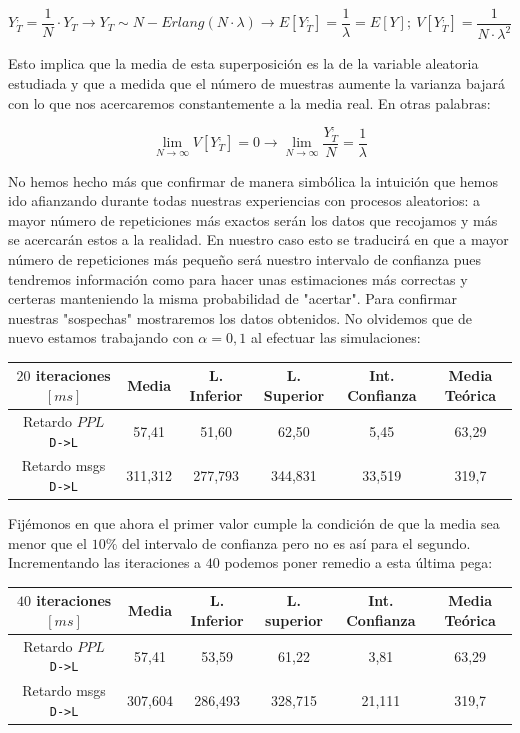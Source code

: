 \documentclass{article}[10pt]
\begin{document}
		$$Y_T^, = \frac{1}{N} \cdot Y_T \rightarrow Y_T \sim N-Erlang(N \cdot \lambda) \rightarrow E[Y_T^,] = \frac{1}{\lambda} = E[Y];\ V[Y_T^,] = \frac{1}{N \cdot \lambda^2}$$

		Esto implica que la media de esta superposición es la de la variable aleatoria estudiada y que a medida que el número de muestras aumente la varianza bajará con lo que nos acercaremos constantemente a la media real. En otras palabras:

		$$\lim_{N \to \infty} V[Y_T^,] = 0 \rightarrow \lim_{N \to \infty} \frac{Y_T^,}{N} = \frac{1}{\lambda}$$

		No hemos hecho más que confirmar de manera simbólica la intuición que hemos ido afianzando durante todas nuestras experiencias con procesos aleatorios: a mayor número de repeticiones más exactos serán los datos que recojamos y más se acercarán estos a la realidad. En nuestro caso esto se traducirá en que a mayor número de repeticiones más pequeño será nuestro intervalo de confianza pues tendremos información como para hacer unas estimaciones más correctas y certeras manteniendo la misma probabilidad de "acertar". Para confirmar nuestras "sospechas" mostraremos los datos obtenidos. No olvidemos que de nuevo estamos trabajando con $\alpha = 0,1$ al efectuar las simulaciones:

		\vskip 3mm

		\begin{center}
			\begin{tabular}{| c | c | c | c | c | c |}
				\hline
				$20$ iteraciones $[ms]$ & Media & L. Inferior & L. Superior & Int. Confianza & Media Teórica\\
				\hline
				Retardo $PPL$ \texttt{D->L} & 57,41 & 51,60 & 62,50 & 5,45 & 63,29\\
				\hline
				Retardo msgs \texttt{D->L} & 311,312 & 277,793 & 344,831 & 33,519 & 319,7\\
				\hline
			\end{tabular}
		\end{center}

		\vskip 3mm

		Fijémonos en que ahora el primer valor cumple la condición de que la media sea menor que el $10\%$ del intervalo de confianza pero no es así para el segundo. Incrementando las iteraciones a $40$ podemos poner remedio a esta última pega:

		\vskip 3mm

		\begin{center}
			\begin{tabular}{| c | c | c | c | c | c |}
				\hline
				$40$ iteraciones $[ms]$ & Media & L. Inferior & L. superior & Int. Confianza & Media Teórica\\
				\hline
				Retardo $PPL$ \texttt{D->L} & 57,41 & 53,59 & 61,22 & 3,81 & 63,29\\
				\hline
				Retardo msgs \texttt{D->L} & 307,604 & 286,493 & 328,715 & 21,111 & 319,7\\
				\hline
			\end{tabular}
		\end{center}
\end{document}
